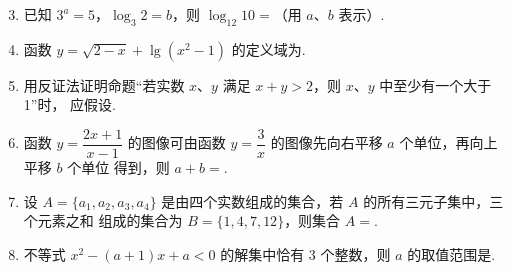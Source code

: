 \documentclass[a4paper,11pt]{article}
\begin{document}


\begin{enumerate}
\setcounter{enumi}{2}

\item 已知 $3^a=5$，$\log_3 2=b$，则 $\log_{12} 10=$\blankline[4.4em]（用 $a$、$b$ 表示）.

\ifanswer
\solbegin
{}
\solend
\fi

\item 函数 $y=\sqrt{2-x}+\lg(x^2-1)$ 的定义域为\blankline[4.4em].

\ifanswer
\solbegin
{}
\step{定义域为 $(-\infty,-1)\cup(1,2]$.}
\solend
\fi

\item 用反证法证明命题“若实数 $x$、$y$ 满足 $x+y>2$，则 $x$、$y$ 中至少有一个大于 1”时，
应假设\blankline[4.4em].

\ifanswer
{}
\fi

\item 函数 $y=\dfrac{2x+1}{x-1}$ 的图像可由函数 $y=\dfrac{3}{x}$ 的图像先向右平移 $a$ 个单位，再向上平移 $b$ 个单位
得到，则 $a+b=$\blankline[4.4em].

\ifanswer
\solbegin
{}
\solend
\fi

\item 设 $A=\{a_1,a_2,a_3,a_4\}$ 是由四个实数组成的集合，若 $A$ 的所有三元子集中，三个元素之和
组成的集合为 $B=\{1,4,7,12\}$，则集合 $A=$\blankline[4.4em].

\ifanswer
\solbegin
{}
\solend
\fi

\item 不等式 $x^2-(a+1)x+a<0$ 的解集中恰有 3 个整数，则 $a$ 的取值范围是\blankline[4.4em].


\end{enumerate}
\end{document}
